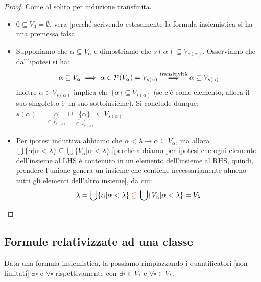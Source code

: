 \begin{proof}
	Come al solito per induzione transfinita.
	\begin{itemize}
		\item[$\boxed{\text{caso $0$}}$] $0 \subseteq V_0 = \emptyset$, vera [perch\'e scrivendo estesamente la formula insiemistica si ha una premessa falsa].
		\item[$\boxed{\text{caso successore}}$] Supponiamo che $\alpha \subseteq V_\alpha$ e dimostriamo che $s(\alpha) \subseteq V_{s(\alpha)}$. Osserviamo che dall'ipotesi si ha:
		\[ \alpha \subseteq V_\alpha \implies \alpha \in \mathcal{P}(V_\alpha) = V_{s(\alpha)} \overset{\text{transitivit\`a}}{\implies} \alpha \subseteq V_{s(\alpha)}
			\]
		inoltre $\alpha \in V_{s(\alpha)}$ implica che $\{\alpha\} \subseteq V_{s(\alpha)}$ (se c'\`e come elemento, allora il suo singoletto \`e un suo sottoinsieme). Si conclude dunque: $s(\alpha) = \underbrace{\alpha}_{\subseteq V_{s(\alpha)}} \cup \underbrace{\{\alpha\}}_{\subseteq V_{s(\alpha)}} \subseteq V_{s(\alpha)}$.
		\item[$\boxed{\text{caso limite}}$] Per ipotesi induttiva abbiamo che $\alpha < \lambda \rightarrow \alpha \subseteq V_\alpha$, ma allora $\bigcup\{\alpha | \alpha < \lambda\} \subseteq \bigcup\{V_\alpha | \alpha < \lambda\}$ [perch\'e abbiamo per ipotesi che ogni elemento dell'insieme al LHS \`e contenuto in un elemento dell'insieme al RHS, 
		quindi, prendere l'unione genera un insieme che contiene necessariamente almeno tutti gli elementi dell'altro insieme], da cui:
		\[ \lambda = \bigcup\{\alpha | \alpha < \lambda\} \;\textcolor{red}{\subseteq}\; \bigcup\{V_\alpha | \alpha < \lambda\} = V_\lambda
			\]
	\end{itemize}
\end{proof}

\subsection{Formule relativizzate ad una classe}

\begin{definition}[Relativizzazione a $V_*$]
	Data una formula insiemistica, la possiamo  rimpiazzando i quantificatori [non limitati] $\exists \square$ e $\forall \square$ rispettivamente con $\exists \square \in V_*$ e $\forall \square \in V_*$.
\end{definition}

